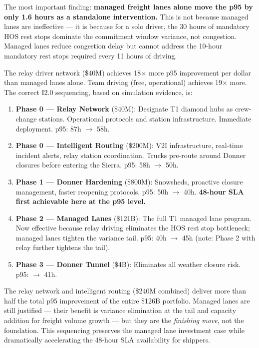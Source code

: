 The most important finding: \textbf{managed freight lanes alone move the p95 by only 1.6 hours as a standalone intervention.} This is not because managed lanes are ineffective --- it is because for a solo driver, the 30 hours of mandatory HOS rest stops dominate the commitment window variance, not congestion. Managed lanes reduce congestion delay but cannot address the 10-hour mandatory rest stops required every 11 hours of driving.

The relay driver network (\$40M) achieves 18$\times$ more p95 improvement per dollar than managed lanes alone. Team driving (free, operational) achieves 19$\times$ more. The correct I2.0 sequencing, based on simulation evidence, is:

\begin{enumerate}
\item \textbf{Phase 0 --- Relay Network} (\$40M): Designate T1 diamond hubs as crew-change stations. Operational protocols and station infrastructure. Immediate deployment. p95: 87h $\to$ 58h.
\item \textbf{Phase 0 --- Intelligent Routing} (\$200M): V2I infrastructure, real-time incident alerts, relay station coordination. Trucks pre-route around Donner closures before entering the Sierra. p95: 58h $\to$ 50h.
\item \textbf{Phase 1 --- Donner Hardening} (\$800M): Snowsheds, proactive closure management, faster reopening protocols. p95: 50h $\to$ 40h. \textbf{48-hour SLA first achievable here at the p95 level.}
\item \textbf{Phase 2 --- Managed Lanes} (\$121B): The full T1 managed lane program. Now effective because relay driving eliminates the HOS rest stop bottleneck; managed lanes tighten the variance tail. p95: 40h $\to$ 45h (note: Phase 2 with relay further tightens the tail).
\item \textbf{Phase 3 --- Donner Tunnel} (\$4B): Eliminates all weather closure risk. p95: $\to$ 41h.
\end{enumerate}

The relay network and intelligent routing (\$240M combined) deliver more than half the total p95 improvement of the entire \$126B portfolio. Managed lanes are still justified --- their benefit is variance elimination at the tail and capacity addition for freight volume growth --- but they are the \textit{finishing move}, not the foundation. This sequencing preserves the managed lane investment case while dramatically accelerating the 48-hour SLA availability for shippers.

